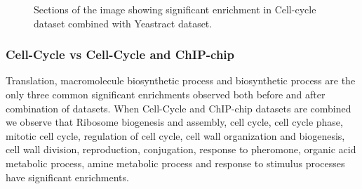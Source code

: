 \begin{figure}[p]
\centering
{}
\label{fig:maxent_ccycle_yt_enrich}
\caption{Sections of the image showing significant enrichment in Cell-cycle dataset combined with Yeastract dataset.}
\end{figure}

\subsubsection{Cell-Cycle vs Cell-Cycle and ChIP-chip}
Translation, macromolecule biosynthetic process and biosynthetic process are the only three common significant enrichments observed 
both before and after combination of datasets. When Cell-Cycle and ChIP-chip datasets are combined we observe that Ribosome biogenesis and assembly, cell cycle, cell cycle phase, mitotic cell cycle, regulation of 
cell cycle, cell wall organization and biogenesis, cell wall division, reproduction, conjugation, response to pheromone, organic 
acid metabolic process, amine metabolic process and response to stimulus processes have significant enrichments. 

